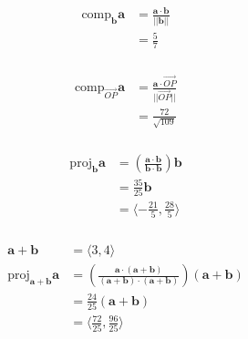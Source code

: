 \documentclass{article}
\begin{document}
\setcounter{subsubsection}{32}
\subsubsection{}

\begin{align*}
  \text{comp}_\mathbf{b} \mathbf{a} & = \frac{\mathbf{a} \cdot \mathbf{b}}{||\mathbf{b}||} \\
                                    & = \frac{5}{7}
\end{align*}

\setcounter{subsubsection}{36}
\subsubsection{}

\begin{align*}
  \text{comp}_{\overrightarrow{O P}} \mathbf{a} & = \frac{\mathbf{a} \cdot \overrightarrow{O P}}{||\overrightarrow{O P}||} \\
                                                & = \frac{72}{\sqrt{109}}
\end{align*}

\setcounter{subsubsection}{38}
\subsubsection{}

\begin{align*}
  \text{proj}_\mathbf{b} \mathbf{a} & = \left( \frac{\mathbf{a} \cdot \mathbf{b}}{\mathbf{b} \cdot \mathbf{b}} \right) \mathbf{b} \\
                                    & = \frac{35}{25} \mathbf{b}                                                                  \\
                                    & = \langle -\frac{21}{5}, \frac{28}{5} \rangle
\end{align*}

\setcounter{subsubsection}{42}
\subsubsection{}

\begin{align*}
  \mathbf{a} + \mathbf{b}                          & = \langle 3, 4 \rangle                                                                                                                                  \\
  \text{proj}_{\mathbf{a} + \mathbf{b}} \mathbf{a} & = \left( \frac{\mathbf{a} \cdot (\mathbf{a} + \mathbf{b})}{(\mathbf{a} + \mathbf{b}) \cdot (\mathbf{a} + \mathbf{b})} \right) (\mathbf{a} + \mathbf{b}) \\
                                                   & = \frac{24}{25} (\mathbf{a} + \mathbf{b})                                                                                                               \\
                                                   & = \langle \frac{72}{25}, \frac{96}{25} \rangle
\end{align*}
\end{document}
